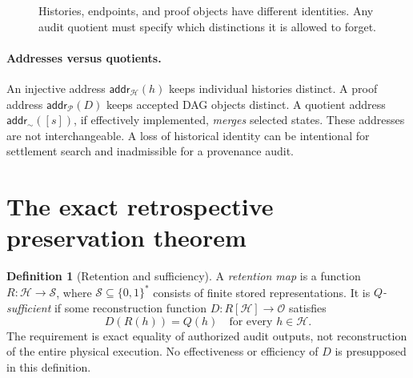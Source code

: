 \documentclass[11pt,letterpaper]{article}
\theoremstyle{definition}
\newtheorem{definition}[theorem]{Definition}
\newcommand{\Hh}{\mathcal H}
\newcommand{\Obs}{\mathcal O}
\newcommand{\State}{\mathcal S}
\begin{document}
\begin{figure}[htbp]\centering
{}
\caption{Histories, endpoints, and proof objects have different identities. Any audit quotient must specify which distinctions it is allowed to forget.}
\label{fig:three-spaces}
\end{figure}

\paragraph{Addresses versus quotients.} An injective address $\mathsf{addr}_{\Hh}(h)$ keeps individual histories distinct. A proof address $\mathsf{addr}_{\mathcal P}(D)$ keeps accepted DAG objects distinct. A quotient address $\mathsf{addr}_{\sim}([s])$, if effectively implemented, \emph{merges} selected states. These addresses are not interchangeable. A loss of historical identity can be intentional for settlement search and inadmissible for a provenance audit.

\section{The exact retrospective preservation theorem}
\begin{definition}[Retention and sufficiency]
A \emph{retention map} is a function $R:\Hh\to\State$, where $\State\subseteq\{0,1\}^*$ consists of finite stored representations. It is \emph{$Q$-sufficient} if some reconstruction function $D:R[\Hh]\to\Obs$ satisfies
\[
D(R(h))=Q(h)\quad\text{for every }h\in\Hh.
\]
The requirement is exact equality of authorized audit outputs, not reconstruction of the entire physical execution. No effectiveness or efficiency of $D$ is presupposed in this definition.
\end{definition}
\end{document}
